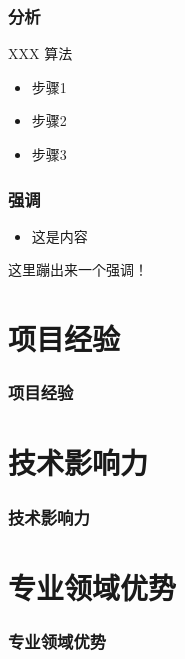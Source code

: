 \documentclass[xcolor=svgnames,serif,table,10pt]{beamer}
\begin{document}
\begin{frame}
  \frametitle{分析}
  \begin{block}{XXX 算法}
	\begin{itemize}
		\item 步骤1
	 	\item 步骤2
	 	\item 步骤3
	 \end{itemize} 
  \end{block}
\end{frame}

\begin{frame}
  \frametitle{强调}
  \begin{itemize}
  \item 这是内容
  \end{itemize}
  \begin{block}{}
    这里蹦出来一个强调！
  \end{block}
\end{frame}

\section{项目经验}
\label{sec:exp}

\begin{frame}
  \frametitle{项目经验}
\end{frame}

\section{技术影响力}
\label{sec:influence}

\begin{frame}
  \frametitle{技术影响力}
\end{frame}

\section{专业领域优势}
\label{sec:advantage}

\begin{frame}
  \frametitle{专业领域优势}
\end{frame}


\begin{frame}[plain]{}
  \begin{center}
  \end{center}
\end{frame}
\end{document}
